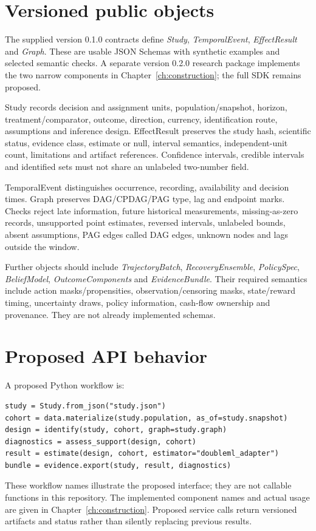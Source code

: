 \section{Versioned public objects}
The supplied version 0.1.0 contracts define \emph{Study},
\emph{TemporalEvent}, \emph{EffectResult} and \emph{Graph}.
These are usable JSON Schemas with synthetic examples and selected semantic
checks. A separate version 0.2.0 research package implements the two narrow
components in Chapter~\ref{ch:construction}; the full SDK remains proposed.

Study records decision and assignment units, population/snapshot,
horizon, treatment/comparator, outcome, direction, currency, identification
route, assumptions and inference design. EffectResult preserves the
study hash, scientific status, evidence class, estimate or null,
interval semantics, independent-unit count, limitations and artifact
references. Confidence intervals, credible intervals and identified sets
must not share an unlabeled two-number field.

TemporalEvent distinguishes occurrence, recording, availability and
decision times. Graph preserves DAG/CPDAG/PAG type, lag and endpoint marks.
Checks reject late information, future historical measurements,
missing-as-zero records, unsupported point estimates, reversed intervals,
unlabeled bounds, absent assumptions, PAG edges called DAG edges,
unknown nodes and lags outside the window.

Further objects should include \emph{TrajectoryBatch},
\emph{RecoveryEnsemble}, \emph{PolicySpec}, \emph{BeliefModel},
\emph{OutcomeComponents} and \emph{EvidenceBundle}. Their required
semantics include action masks/propensities, observation/censoring masks,
state/reward timing, uncertainty draws, policy information, cash-flow
ownership and provenance. They are not already implemented schemas.

\section{Proposed API behavior}
A proposed Python workflow is:
\begin{lstlisting}
study = Study.from_json("study.json")
cohort = data.materialize(study.population, as_of=study.snapshot)
design = identify(study, cohort, graph=study.graph)
diagnostics = assess_support(design, cohort)
result = estimate(design, cohort, estimator="doubleml_adapter")
bundle = evidence.export(study, result, diagnostics)
\end{lstlisting}
These workflow names illustrate the proposed interface; they are not callable
functions in this repository. The implemented component names and actual
usage are given in Chapter~\ref{ch:construction}. Proposed service calls
return versioned artifacts and status rather than silently replacing
previous results.

